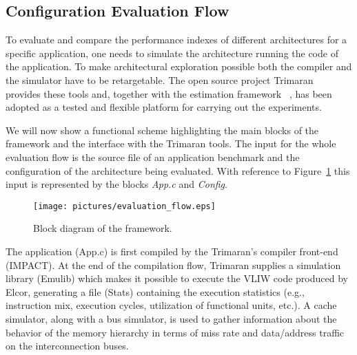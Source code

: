 \begin{table}
\end{table}
\subsection{Configuration Evaluation Flow}

To evaluate and compare the performance indexes of different
architectures for a specific application, one needs to simulate the
architecture running the code of the application. To make
architectural exploration possible both the compiler and the simulator
have to be retargetable. The open source project Trimaran~\cite{trimaran_hp} provides these
tools and, together with the estimation framework \ee~\cite{palpatti_estimedia03}, has been
adopted as a tested and flexible platform for carrying out the
experiments.

We will now show a functional scheme highlighting the main blocks of
the \ee{} framework and the interface with the Trimaran tools. The
input for the whole evaluation flow is the source file of an application
benchmark and the configuration of the architecture
being evaluated.  With reference to Figure~\ref{fig:evaluation_flow}
this input is represented by the blocks \emph{App.c} and
\emph{Config}.
\begin{figure}
        \centering
        \texttt{[image: pictures/evaluation\_flow.eps]}
        \caption{Block diagram of the framework.}
        \label{fig:evaluation_flow}
\end{figure}

The application (App.c) is first compiled by the Trimaran's compiler
front-end (IMPACT). At the end of the compilation flow,
Trimaran supplies a simulation library (Emulib) which makes it
possible to execute the VLIW code produced by Elcor, generating a file
(Stats) containing the execution statistics (e.g., instruction mix,
execution cycles, utilization of functional units, etc.). A cache
simulator, along with a bus simulator, is used to gather information
about the behavior of the memory hierarchy in terms of miss rate and
data/address traffic on the interconnection buses.

